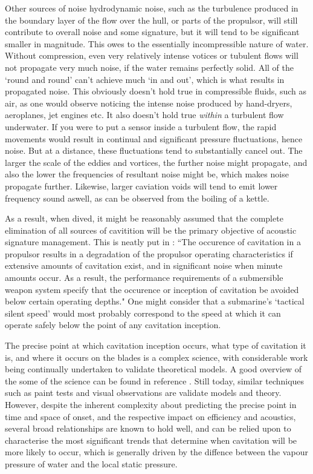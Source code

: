 \documentclass{article}\usepackage[]{graphicx}\usepackage[]{color}
\begin{document}
Other sources of noise hydrodynamic noise, such as the turbulence produced in the boundary layer of the flow over the hull, or parts of the propulsor, will still contribute to overall noise and some signature, but it will tend to be significant smaller in magnitude.  This owes to the essentially incompressible nature of water.  Without compression, even very relatively intense votices or tubulent flows will not propagate very much noise, if the water remains perfectly solid.  All of the `round and round' can't achieve much `in and out', which is what results in propagated noise.  This obviously doesn't hold true in compressible fluids, such as air, as one would observe noticing the intense noise produced by hand-dryers, aeroplanes, jet engines etc.  It also doesn't hold true \textit{within} a turbulent flow underwater.  If you were to put a sensor inside a turbulent flow, the rapid movements would result in continual and significant pressure fluctuations, hence noise.  But at a distance, these fluctuations tend to substantially cancel out.  The larger the scale of the eddies and vortices, the further noise might propagate, and also the lower the frequencies of resultant noise might be, which makes noise propagate further.  Likewise, larger caviation voids will tend to emit lower frequency sound aswell, as can be observed from the boiling of a kettle.

As a result, when dived, it might be reasonably assumed that the complete elimination of all sources of cavitition will be the primary objective of acoustic signature management.  This is neatly put in \cite[88]{gearhart1966selection}: ``The occurence of cavitation in a propulsor results in a degradation of the propulsor operating characteristics if extensive amounts of cavitation exist, and in significant noise when minute amounts occur.  As a result, the performance requirements of a submersible weapon system specify that the occurence or inception of cavitation be avoided below certain operating depths." One might consider that a submarine's `tactical silent speed' would most probably correspond to the speed at which it can operate safely below the point of any cavitation inception.

The precise point at which cavitation inception occurs, what type of cavitation it is, and where it occurs on the blades is a complex science, with considerable work being continually undertaken to validate theoretical models. A good overview of the some of the science can be found in reference \cite{kuiper1981cavitation}.  Still today, similar techniques such as paint tests and visual observations are validate models and theory. However, despite the inherent complexity about predicting the precise point in time and space of onset, and the respective impact on efficiency and acoustics, several broad relationships are known to hold well, and can be relied upon to characterise the most significant trends that determine when cavitation will be more likely to occur, which is generally driven by the diffence between the vapour pressure of water and the local static pressure.
\end{document}

